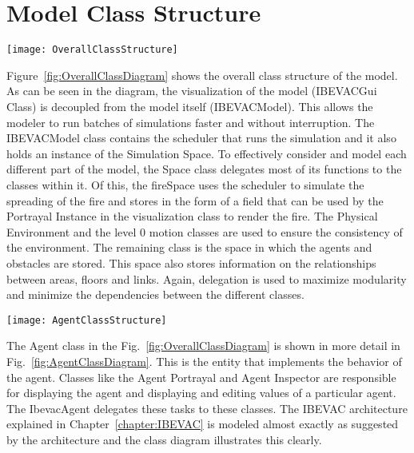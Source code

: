 
\chapter{Model Class Structure}


\begin{sidewaysfigure}[!htb]
\centering
\texttt{[image: OverallClassStructure]}
\caption[Overall Class Structure]{Class Diagram shows the overall class structure of the model}
\label{fig:OverallClassDiagram}
\end{sidewaysfigure}

Figure~\ref{fig:OverallClassDiagram} shows the overall class structure of the model. As can be seen in the diagram, the visualization of the model (IBEVACGui Class) is decoupled from the model itself (IBEVACModel). This allows the modeler to run batches of simulations faster and without interruption. The IBEVACModel class contains the scheduler that runs the simulation and it also holds an instance of the Simulation Space. To effectively consider and model each different part of the model, the Space class delegates most of its functions to the classes within it. Of this, the fireSpace uses the scheduler to simulate the spreading of the fire and stores in the form of a field that can be used by the Portrayal Instance in the visualization class to render the fire. The Physical Environment and the level 0 motion classes are used to ensure the consistency of the environment. The remaining class is the space in which the agents and obstacles are stored. This space also stores information on the relationships between areas, floors and links. Again, delegation is used to maximize modularity and minimize the dependencies between the different classes.

\begin{sidewaysfigure}[!htb]
\centering
\texttt{[image: AgentClassStructure]}
\caption[Agent Class Structure]{This Class Diagram shows the agent class in detail}
\label{fig:AgentClassDiagram}
\end{sidewaysfigure}

The Agent class in the Fig.~\ref{fig:OverallClassDiagram} is shown in more detail in Fig.~\ref{fig:AgentClassDiagram}. This is the entity that implements the behavior of the agent. Classes like the Agent Portrayal and Agent Inspector are responsible for displaying the agent and displaying and editing values of a particular agent. The IbevacAgent delegates these tasks to these classes. The IBEVAC architecture explained in Chapter~\ref{chapter:IBEVAC} is modeled almost exactly as suggested by the architecture and the class diagram illustrates this clearly.

